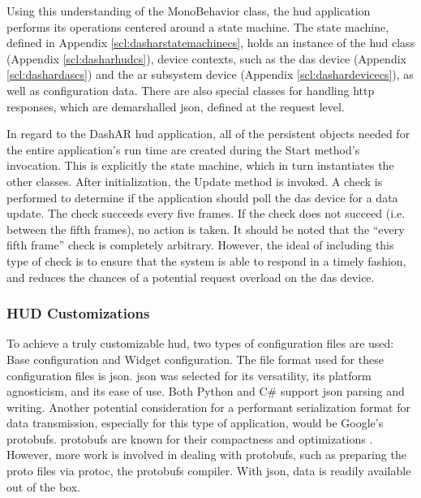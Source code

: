             \par Using this understanding of the MonoBehavior class, the \gls{hud} application performs its operations centered around a state machine. The state machine, defined in Appendix \ref{scl:dasharstatemachinecs}, holds an instance of the \gls{hud} class (Appendix \ref{scl:dasharhudcs}), device contexts, such as the \gls{das} device (Appendix \ref{scl:dashardascs}) and the \gls{ar} subsystem device (Appendix \ref{scl:dashardevicecs}), as well as configuration data. There are also special classes for handling \gls{http} responses, which are demarshalled \gls{json}, defined at the request level.

            \par In regard to the DashAR \gls{hud} application, all of the persistent objects needed for the entire application's run time are created during the Start method's invocation. This is explicitly the state machine, which in turn instantiates the other classes. After initialization, the Update method is invoked. A check is performed to determine if the application should poll the \gls{das} device for a data update. The check succeeds every five frames. If the check does not succeed (i.e. between the fifth frames), no action is taken. It should be noted that the ``every fifth frame'' check is completely arbitrary. However, the ideal of including this type of check is to ensure that the system is able to respond in a timely fashion, and reduces the chances of a potential request overload on the \gls{das} device.

        \subsubsection{HUD Customizations}
            \par To achieve a truly customizable \gls{hud}, two types of configuration files are used: Base configuration and Widget configuration. The file format used for these configuration files is \gls{json}. \gls{json} was selected for its versatility, its platform agnosticism, and its ease of use. Both Python and C\# support \gls{json} parsing and writing. Another potential consideration for a performant serialization format for data transmission, especially for this type of application, would be Google's \gls{protobufs}. \gls{protobufs} are known for their compactness and optimizations \cite{GoogleLLC2025}. However, more work is involved in dealing with \gls{protobufs}, such as preparing the proto files via protoc, the \gls{protobufs} compiler. With \gls{json}, data is readily available out of the box.

